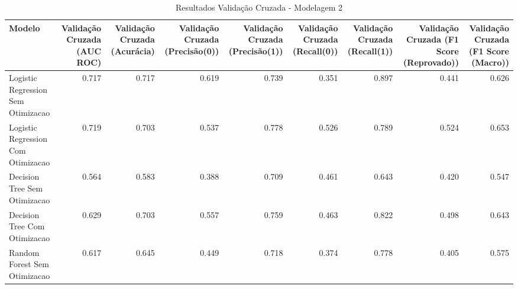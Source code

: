 \begin{table}[H] %
    \centering
    \caption{Resultados Validação Cruzada - Modelagem 2}
    \label{tab:resultados_cv_modelagem_2}
    \renewcommand{\arraystretch}{1.25} %
    \begin{adjustwidth}{ -1in }{ -1in } %
    \centering %
    \small %
    \begin{tabular}{lrrrrrrrr}
\toprule
                            Modelo &  Validação Cruzada (AUC ROC) &  Validação Cruzada (Acurácia) &  Validação Cruzada (Precisão(0)) &  Validação Cruzada (Precisão(1)) &  Validação Cruzada (Recall(0)) &  Validação Cruzada (Recall(1)) &  Validação Cruzada (F1 Score (Reprovado)) &  Validação Cruzada (F1 Score (Macro)) \\
\midrule
Logistic Regression Sem Otimizacao &                        0.717 &                         0.717 &                            0.619 &                            0.739 &                          0.351 &                          0.897 &                                     0.441 &                                 0.626 \\
Logistic Regression Com Otimizacao &                        0.719 &                         0.703 &                            0.537 &                            0.778 &                          0.526 &                          0.789 &                                     0.524 &                                 0.653 \\
      Decision Tree Sem Otimizacao &                        0.564 &                         0.583 &                            0.388 &                            0.709 &                          0.461 &                          0.643 &                                     0.420 &                                 0.547 \\
      Decision Tree Com Otimizacao &                        0.629 &                         0.703 &                            0.557 &                            0.759 &                          0.463 &                          0.822 &                                     0.498 &                                 0.643 \\
      Random Forest Sem Otimizacao &                        0.617 &                         0.645 &                            0.449 &                            0.718 &                          0.374 &                          0.778 &                                     0.405 &                                 0.575 \\

\end{tabular}
\end{adjustwidth}
\end{table}
